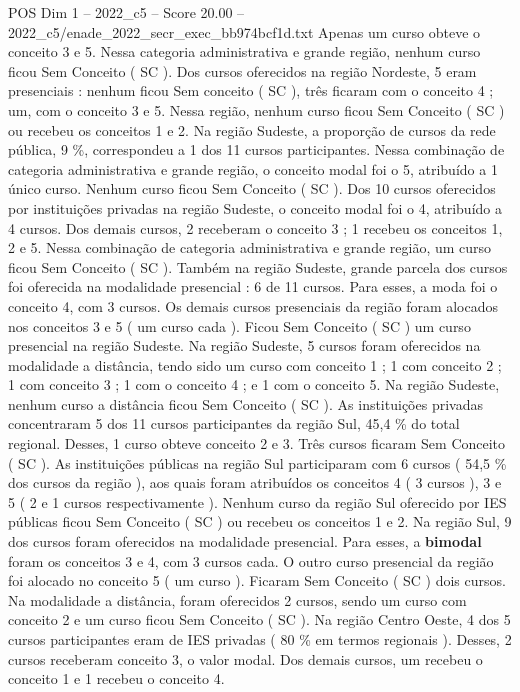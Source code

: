 \begin{textsample}{POS Dim 1 – 2022\_c5 – Score 20.00 – 2022\_c5/enade\_2022\_secr\_exec\_bb974bcf1d.txt}
Apenas um curso obteve o conceito 3 e 5.
Nessa categoria administrativa e grande região, nenhum curso ficou Sem Conceito ( SC ).
Dos cursos oferecidos na região Nordeste, 5 eram presenciais : nenhum ficou Sem conceito ( SC ), três ficaram com o conceito 4 ; um, com o conceito 3 e 5.
Nessa região, nenhum curso ficou Sem Conceito ( SC ) ou recebeu os conceitos 1 e 2.
Na região Sudeste, a proporção de cursos da rede pública, 9 \%, correspondeu a 1 dos 11 cursos participantes.
Nessa combinação de categoria administrativa e grande região, o conceito modal foi o 5, atribuído a 1 único curso.
Nenhum curso ficou Sem Conceito ( SC ).
Dos 10 cursos oferecidos por instituições privadas na região Sudeste, o conceito modal foi o 4, atribuído a 4 cursos.
Dos demais cursos, 2 receberam o conceito 3 ; 1 recebeu os conceitos 1, 2 e 5.
Nessa combinação de categoria administrativa e grande região, um curso ficou Sem Conceito ( SC ).
Também na região Sudeste, grande parcela dos cursos foi oferecida na modalidade presencial : 6 de 11 cursos.
Para esses, a moda foi o conceito 4, com 3 cursos.
Os demais cursos presenciais da região foram alocados nos conceitos 3 e 5 ( um curso cada ).
Ficou Sem Conceito ( SC ) um curso presencial na região Sudeste.
Na região Sudeste, 5 cursos foram oferecidos na modalidade a distância, tendo sido um curso com conceito 1 ; 1 com conceito 2 ; 1 com conceito 3 ; 1 com o conceito 4 ; e 1 com o conceito 5.
Na região Sudeste, nenhum curso a distância ficou Sem Conceito ( SC ).
As instituições privadas concentraram 5 dos 11 cursos participantes da região Sul, 45,4 \% do total regional.
Desses, 1 curso obteve conceito 2 e 3.
Três cursos ficaram Sem Conceito ( SC ).
As instituições públicas na região Sul participaram com 6 cursos ( 54,5 \% dos cursos da região ), aos quais foram atribuídos os conceitos 4 ( 3 cursos ), 3 e 5 ( 2 e 1 cursos respectivamente ).
Nenhum curso da região Sul oferecido por IES públicas ficou Sem Conceito ( SC ) ou recebeu os conceitos 1 e 2.
Na região Sul, 9 dos cursos foram oferecidos na modalidade presencial.
Para esses, a \textbf{bimodal} foram os conceitos 3 e 4, com 3 cursos cada.
O outro curso presencial da região foi alocado no conceito 5 ( um curso ).
Ficaram Sem Conceito ( SC ) dois cursos.
Na modalidade a distância, foram oferecidos 2 cursos, sendo um curso com conceito 2 e um curso ficou Sem Conceito ( SC ).
Na região Centro Oeste, 4 dos 5 cursos participantes eram de IES privadas ( 80 \% em termos regionais ).
Desses, 2 cursos receberam conceito 3, o valor modal.
Dos demais cursos, um recebeu o conceito 1 e 1 recebeu o conceito 4.

\end{textsample}

